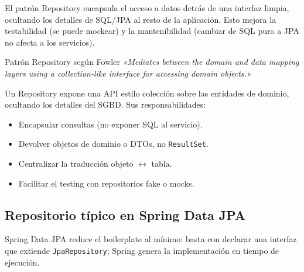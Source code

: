 El patrón Repository encapsula el acceso a datos detrás de
una interfaz limpia, ocultando los detalles de SQL/JPA al resto de
la aplicación. Esto mejora la testabilidad (se puede mockear) y la
mantenibilidad (cambiar de SQL puro a JPA no afecta a los servicios).


\begin{cajadefinicion}{Patrón Repository según Fowler}
\emph{«Mediates between the domain and data mapping layers using a
collection-like interface for accessing domain objects.»}
\cite{fowler2002patterns}

Un Repository expone una API estilo colección sobre las entidades de
dominio, ocultando los detalles del SGBD. Sus responsabilidades:
\begin{itemize}
\item Encapsular consultas (no exponer SQL al servicio).
\item Devolver objetos de dominio o DTOs, no \texttt{ResultSet}.
\item Centralizar la traducción objeto $\leftrightarrow$ tabla.
\item Facilitar el testing con repositorios fake o mocks.
\end{itemize}
\end{cajadefinicion}

\subsection{Repositorio típico en Spring Data JPA}

Spring Data JPA reduce el boilerplate al mínimo: basta con declarar
una interfaz que extiende \texttt{JpaRepository}; Spring genera la
implementación en tiempo de ejecución.

